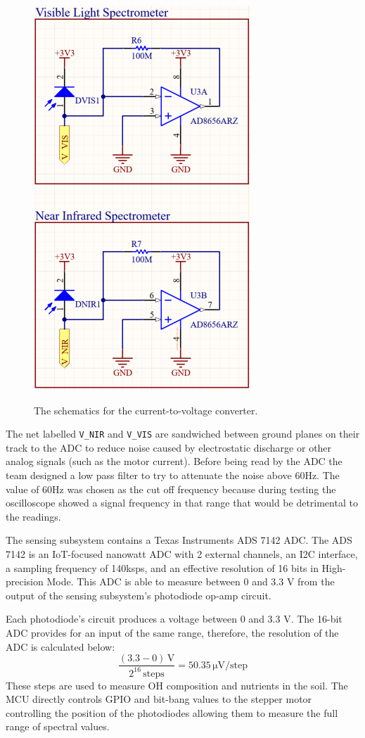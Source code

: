 \documentclass[journal]{IEEEtran}
\begin{document}
\begin{figure}[H]
    \centering
    \includegraphics[height=.25\textheight]{images/SensorSchematics.PNG}
    \label{fig:sensor-schematic}
    \caption{The schematics for the current-to-voltage converter.}
\end{figure}
The net labelled \verb|V_NIR| and \verb|V_VIS| are sandwiched between ground planes on their track
to the ADC to reduce noise caused by electrostatic discharge or other analog signals (such as the
motor current). Before being read by the ADC the team designed a low pass filter to try to attenuate
the noise above 60Hz. The value of 60Hz was chosen as the cut off frequency because during
testing the oscilloscope showed a signal frequency in that range that would be detrimental to the
readings.

The sensing subsystem contains a Texas Instruments ADS 7142 ADC. The ADS 7142 is an IoT-focused nanowatt ADC with 2 external channels, an I2C interface, a sampling frequency of 140ksps, and an effective resolution of 16 bits in High-precision Mode. This ADC is able to measure between 0 and 3.3 V from the output of the sensing subsystem's photodiode op-amp circuit.

Each photodiode's circuit produces a voltage between 0 and 3.3 V. The 16-bit ADC provides for an input of the same range, therefore, the resolution of the ADC is calculated below:
\begin{equation}
	\frac{(3.3 - 0)\,\mathrm{V}}{2^{16}\,\mathrm{steps}} =
	50.35\,\mathrm{\mu V}/\mathrm{step}
\end{equation}
These steps are used to measure OH composition and nutrients in the soil. The MCU directly controls GPIO and bit-bang values to the stepper motor controlling the position of the photodiodes allowing them to measure the full range of spectral values.
\end{document}
